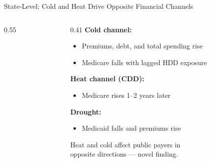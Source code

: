 \documentclass[aspectratio=169,11pt]{beamer}
\newcommand{\tealtext}[1]{{\color{Teal}#1}}
\begin{document}
\begin{frame}{State-Level: Cold and Heat Drive Opposite Financial Channels}
\begin{columns}[T]
\begin{column}{0.55\textwidth}
\begin{center}
      \end{center}
    \end{column}
    \begin{column}{0.41\textwidth}
      \footnotesize
      \textbf{Cold channel:}
      \begin{itemize}\itemsep0.10em
        \item Premiums, debt, and total spending rise
        \item Medicare falls with lagged HDD exposure
      \end{itemize}
      \vspace{0.15em}
      \textbf{Heat channel (CDD):}
      \begin{itemize}\itemsep0.10em
        \item Medicare rises 1--2 years later
      \end{itemize}
      \vspace{0.15em}
      \textbf{Drought:}
      \begin{itemize}\itemsep0.10em
        \item Medicaid falls and premiums rise
      \end{itemize}
      \vspace{0.15em}
      \tealtext{\footnotesize Heat and cold affect public payers in\\opposite directions — novel finding.}
    \end{column}
  \end{columns}
\end{frame}
\end{document}
